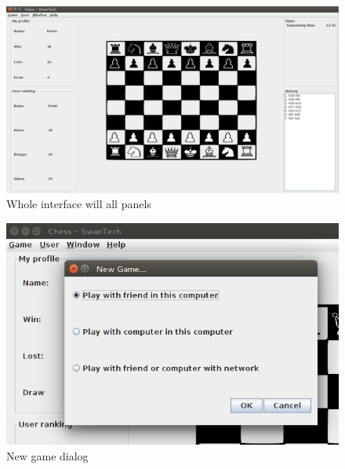 \documentclass[a4paper,10pt]{article}
\begin{document}
\begin{figure}[h]
  \centering
	\includegraphics[width=\textwidth]{WholeApp.png}
  \caption{Whole interface will all panels  \label{fig:wholeapp}}
\end{figure}

\clearpage
\pagebreak
\begin{figure}
  \centering
	\includegraphics[width=\textwidth]{NewGame.png}
  \caption{New game dialog  \label{fig:newgamedialog}}
\end{figure}
\end{document}
